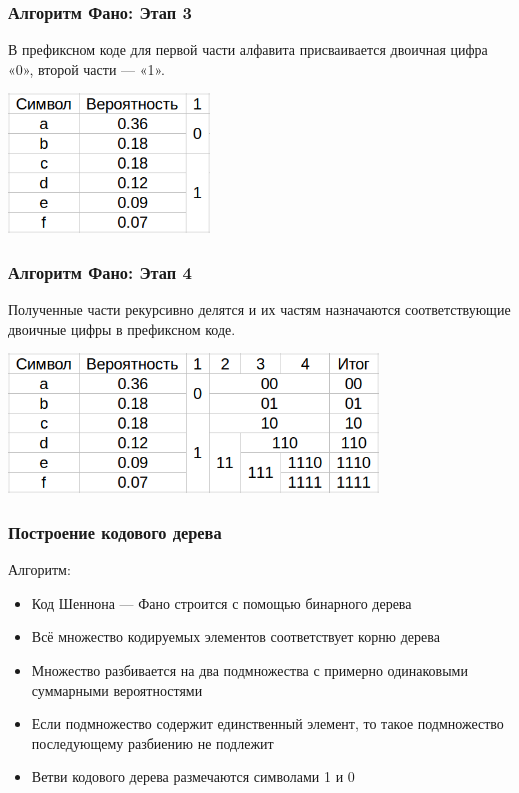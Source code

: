 \documentclass[10pt,pdf,hyperref={unicode}]{beamer}
\begin{document}
\begin{frame}
	\frametitle{Алгоритм Фано: Этап 3}
	В префиксном коде для первой части алфавита присваивается двоичная цифра «0», второй части — «1».
	
	\vspace{1em}
	\includegraphics[height=10em]{alg2.png}
\end{frame}

\begin{frame}
	\frametitle{Алгоритм Фано: Этап 4}
	Полученные части рекурсивно делятся и их частям назначаются соответствующие двоичные цифры в префиксном коде.
	
	\vspace{1em}
	\includegraphics[height=10em]{alg3.png}
\end{frame}

\begin{frame}
	\frametitle{Построение кодового дерева}
	Алгоритм:
	\begin{itemize}
		\item Код Шеннона — Фано строится с помощью бинарного дерева
		\item Всё множество кодируемых элементов соответствует корню дерева
		\item Множество разбивается на два подмножества с примерно одинаковыми суммарными вероятностями
		\item Если подмножество содержит единственный элемент, то такое подмножество последующему разбиению не подлежит
		\item Ветви кодового дерева размечаются символами 1 и 0
	\end{itemize}
\end{frame}
\end{document}
